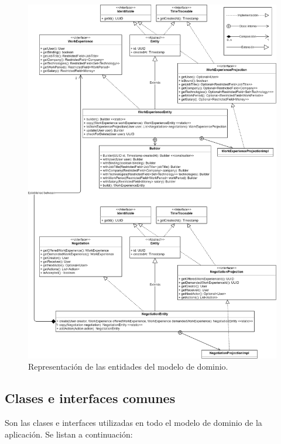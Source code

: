 \documentclass[a4paper, 12pt]{book}
\begin{document}
    \begin{figure}
        \centering
        \includegraphics[width=15cm, keepaspectratio]{img/Modelo_dominio_entities.png}
        \caption{Representación de las entidades del modelo de dominio.}\label{fig:domain_model_entities}
    \end{figure}

    \subsection{Clases e interfaces comunes}
    \label{subsec:common_classes}
    Son las clases e interfaces utilizadas en todo el modelo de dominio de la aplicación. Se listan a continuación:
\end{document}
